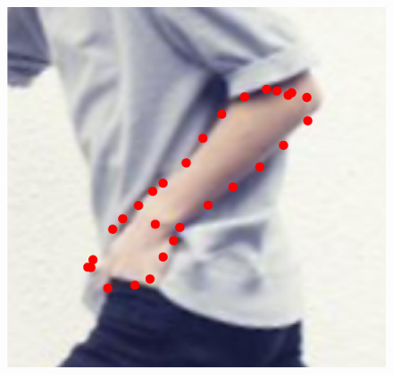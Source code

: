 \begin{figure}[!t]
    \includegraphics[height=\ofh]{resources/Fittings/33.eps}
    \hfill

\end{figure}
